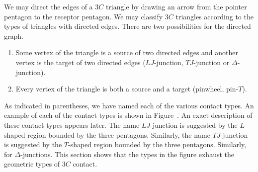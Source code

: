 We may direct the edges of a $3C$ triangle by drawing an arrow from
the pointer pentagon to the receptor pentagon.  We may classify $3C$
triangles according to the types of triangles with directed edges.
There are two possibilities for the directed graph.
\begin{enumerate}
\item Some vertex of the triangle is a source of two directed edges
  and another vertex is the target of two directed edges
  ($LJ$-junction, $TJ$-junction or $\Delta$-junction).
\item Every vertex of the triangle is both a source and a target
  (pinwheel, pin-$T$).
\end{enumerate}

As indicated in parentheses, we have named each of the various contact
types.  An example of each of the contact types is shown in
Figure~.  An exact description of these contact types
appears later.  The name $LJ$-junction is suggested by the $L$-shaped
region bounded by the three pentagons.  Similarly, the name
$TJ$-junction is suggested by the $T$-shaped region bounded by the
three pentagons.  Similarly, for $\Delta$-junctions.  This section
shows that the types in the figure exhaust the geometric types of
$3C$ contact.


